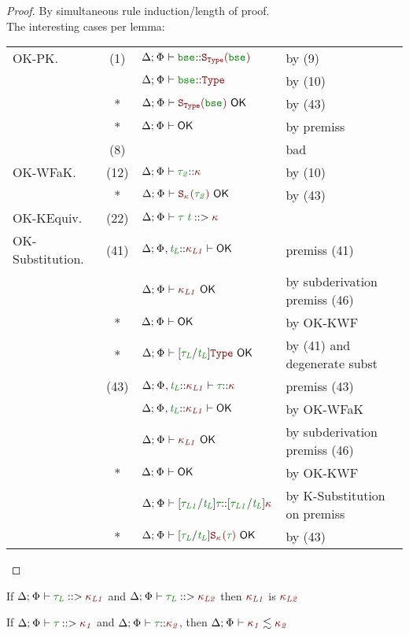 \documentclass[11pt]{article}
\begin{document}
    \begin{proof}
        By simultaneous rule induction/length of proof. \\
        The interesting cases per lemma: \\
        \begin{tabular*}{\textwidth}{lc@{\extracolsep{\fill}}ll}
            OK-PK.
                &(1)& $\WellFormedAtKind{\bse}[\SKind[\Type][\bse]]$ & by (9) \\
                & & $\WellFormedAtKind{\bse}[\Type]$ & by (10) \\
                &*& $\KindWellFormed[{\SKind[\Type][\bse]}]$ & by (43) \\
                &*& $\ContextWellFormed$ & by premiss \\
                &(8)& & bad \\
            OK-WFaK.
                &(12)& $\WellFormedAtKind{\typ[2]}$ & by (10) \\
                &*& $\KindWellFormed[{\SKind[\knd][\typ[2]]}]$ & by (43) \\
            OK-KEquiv.
                &(22)& $\PrincipalKind{\TypeAp[\typ][\typvar]}$ & \\
            OK-Substitution.
                &(41)& $\ContextWellFormed[\HoleCtx\ExtendTypVarCtx[][L][{\knd[L1]}]]$ & premiss (41) \\
                & & $\KindWellFormed[{\knd[L1]}]$ & by subderivation premiss (46) \\
                &*& $\ContextWellFormed$ & by OK-KWF \\
                &*& $\KindWellFormed[\subst{\typ[L]}{\typvar[L]}{\Type}]$ & by (41) and degenerate subst \\
                &(43)& $\WellFormedAtKind[\HoleCtx\ExtendTypVarCtx[][L][{\knd[L1]}]]{\typ}[\knd]$ & premiss (43) \\
                & & $\ContextWellFormed[\HoleCtx\ExtendTypVarCtx[][L][{\knd[L1]}]]$ & by OK-WFaK \\
                & & $\KindWellFormed[{\knd[L1]}]$ & by subderivation premiss (46) \\
                &*& $\ContextWellFormed$ & by OK-KWF \\
                & & $\WellFormedAtKind{\subst{\typ[L1]}{\typvar[L]}{\typ}}[\subst{\typ[L1]}{\typvar[L]}{\knd}]$ & by K-Substitution on premiss \\
                &*& $\KindWellFormed[\subst{\typ[L]}{\typvar[L]}{\SKind}]$ & by (43) \\
        \end{tabular*}
    \end{proof}
    \vphantom{.}
    \begin{lemma}[PK-Unicity]
        If $\PrincipalKind{\typ[L]}[\knd[L1]]$ and $\PrincipalKind{\typ[L]}[\knd[L2]]$ then ${\knd[L1]}$ is ${\knd[L2]}$
    \end{lemma}
    \begin{lemma}
        If $\PrincipalKind{\typ}[\knd[1]]$ and $\WellFormedAtKind{\typ}[\knd[2]]$, then $\ConsistentSubKind{\knd[1]}{\knd[2]}$
    \end{lemma}
\end{document}
